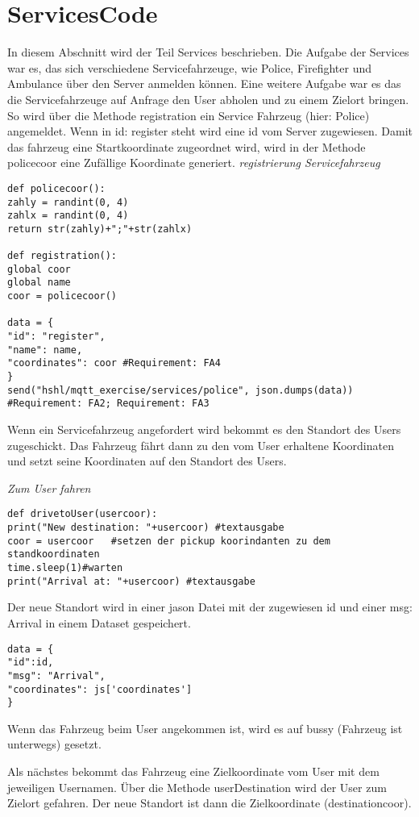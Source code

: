 \section{ServicesCode}
In diesem Abschnitt wird der Teil Services beschrieben. 
Die Aufgabe der Services war es, das sich verschiedene Servicefahrzeuge, wie Police, Firefighter und Ambulance über den Server anmelden können. Eine weitere Aufgabe war es das die Servicefahrzeuge auf Anfrage den User abholen und zu einem Zielort bringen.
So wird über die Methode registration ein Service Fahrzeug (hier: Police) angemeldet. Wenn in id: register steht wird eine id vom Server zugewiesen.
Damit das fahrzeug eine Startkoordinate zugeordnet wird, wird in der Methode policecoor eine Zufällige Koordinate generiert. 
\newline
\textit{registrierung Servicefahrzeug}
\begin{lstlisting}
def policecoor(): 
zahly = randint(0, 4)
zahlx = randint(0, 4)
return str(zahly)+";"+str(zahlx)

def registration():
global coor
global name
coor = policecoor()

data = {
"id": "register",
"name": name,
"coordinates": coor #Requirement: FA4
}
send("hshl/mqtt_exercise/services/police", json.dumps(data)) #Requirement: FA2; Requirement: FA3
\end{lstlisting}

Wenn ein Servicefahrzeug angefordert wird bekommt es den Standort des Users zugeschickt. 
Das Fahrzeug fährt dann zu den vom User erhaltene Koordinaten und setzt seine Koordinaten auf den Standort des Users.


\textit{Zum User fahren}
\begin{lstlisting}
def drivetoUser(usercoor):
print("New destination: "+usercoor) #textausgabe
coor = usercoor   #setzen der pickup koorindanten zu dem standkoordinaten
time.sleep(1)#warten
print("Arrival at: "+usercoor) #textausgabe
\end{lstlisting}


Der neue Standort wird in einer jason Datei mit der zugewiesen id und einer msg: Arrival in einem Dataset gespeichert.
\begin{lstlisting}
data = {
"id":id,
"msg": "Arrival",
"coordinates": js['coordinates']
}
\end{lstlisting}
Wenn das Fahrzeug beim User angekommen ist, wird es auf bussy (Fahrzeug ist unterwegs) gesetzt.


Als nächstes bekommt das Fahrzeug eine Zielkoordinate vom User mit dem jeweiligen Usernamen.
Über die Methode userDestination wird der User zum Zielort gefahren. Der neue Standort ist dann die Zielkoordinate (destinationcoor).


